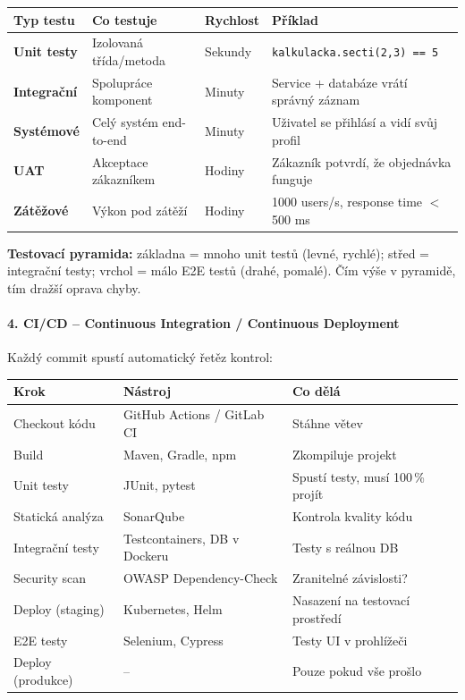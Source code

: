 \begin{center}
\begin{tabular}{llll}
\toprule
\textbf{Typ testu} & \textbf{Co testuje} & \textbf{Rychlost} & \textbf{Příklad} \\
\midrule
\textbf{Unit testy} & Izolovaná třída/metoda & Sekundy & \texttt{kalkulacka.secti(2,3) == 5} \\
\textbf{Integrační} & Spolupráce komponent & Minuty & Service + databáze vrátí správný záznam \\
\textbf{Systémové} & Celý systém end-to-end & Minuty & Uživatel se přihlásí a vidí svůj profil \\
\textbf{UAT} & Akceptace zákazníkem & Hodiny & Zákazník potvrdí, že objednávka funguje \\
\textbf{Zátěžové} & Výkon pod zátěží & Hodiny & 1000 users/s, response time $<$ 500 ms \\
\bottomrule
\end{tabular}
\end{center}

\textbf{Testovací pyramida:} základna = mnoho unit testů (levné, rychlé); střed = integrační testy;
vrchol = málo E2E testů (drahé, pomalé). Čím výše v pyramidě, tím dražší oprava chyby.

\paragraph{4. CI/CD -- Continuous Integration / Continuous Deployment}
Každý commit spustí automatický řetěz kontrol:

\begin{center}
\begin{tabular}{lll}
\toprule
\textbf{Krok} & \textbf{Nástroj} & \textbf{Co dělá} \\
\midrule
Checkout kódu & GitHub Actions / GitLab CI & Stáhne větev \\
Build & Maven, Gradle, npm & Zkompiluje projekt \\
Unit testy & JUnit, pytest & Spustí testy, musí 100\,\% projít \\
Statická analýza & SonarQube & Kontrola kvality kódu \\
Integrační testy & Testcontainers, DB v Dockeru & Testy s reálnou DB \\
Security scan & OWASP Dependency-Check & Zranitelné závislosti? \\
Deploy (staging) & Kubernetes, Helm & Nasazení na testovací prostředí \\
E2E testy & Selenium, Cypress & Testy UI v prohlížeči \\
Deploy (produkce) & -- & Pouze pokud vše prošlo \\
\bottomrule
\end{tabular}
\end{center}

